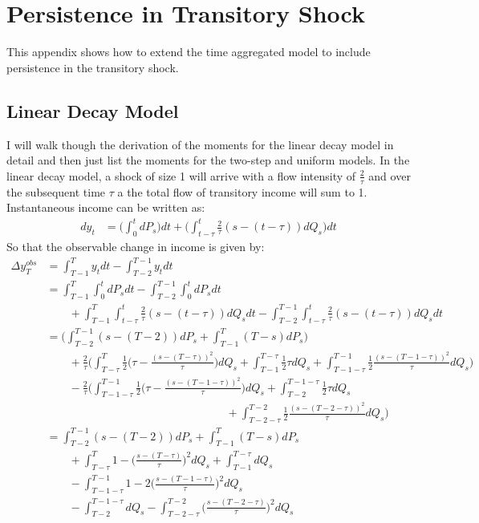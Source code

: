 \section{Persistence in Transitory Shock} \label{persistence_appendix}
This appendix shows how to extend the time aggregated model to include persistence in the transitory shock.

\subsection{Linear Decay Model}
I will walk though the derivation of the moments for the linear decay model in detail and then just list the moments for the two-step and uniform models. In the linear decay model, a shock of size 1 will arrive with a flow intensity of $\frac{2}{\tau}$ and over the subsequent time $\tau$ a the total flow of transitory income will sum to 1. Instantaneous income can be written as:
 \begin{align*}
dy_t &= \Big(\int_{0}^{t} dP_s \Big) dt +\Big(\int_{t-\tau}^{t} \frac{2}{\tau}(s-(t-\tau)) dQ_s \Big)dt
 \end{align*}
So that the observable change in income is given by:
\begin{align}
\Delta y^{obs}_T &= \int_{T-1}^{T} y_t dt - \int_{T-2}^{T-1} y_t dt \nonumber \\ 
&= \int_{T-1}^{T} \int_{0}^{t}dP_s dt -\int_{T-2}^{T-1} \int_{0}^{t}dP_s dt \nonumber \\
& \qquad +  \int_{T-1}^{T} \int_{t-\tau}^{t} \frac{2}{\tau}(s-(t-\tau)) dQ_s dt -\int_{T-2}^{T-1}\int_{t-\tau}^{t} \frac{2}{\tau}(s-(t-\tau)) dQ_s dt \nonumber \\
&= \Big(\int_{T-2}^{T-1} (s-(T-2))dP_s  + \int_{T-1}^{T} (T-s)dP_s \Big) \nonumber \\
&  \qquad +\frac{2}{\tau} \Big(\int_{T-\tau}^{T} \frac{1}{2}\Big(\tau - \frac{(s-(T-\tau))^2}{\tau} \Big)dQ_s  +\int_{T-1}^{T-\tau} \frac{1}{2}\tau dQ_s  +\int_{T-1-\tau}^{T-1} \frac{1}{2}\frac{(s-(T-1-\tau))^2}{\tau} dQ_s \Big) \nonumber \\
& \qquad -\frac{2}{\tau}  \Big(\int_{T-1-\tau}^{T-1} \frac{1}{2}\Big(\tau - \frac{(s-(T-1-\tau))^2}{\tau} \Big)dQ_s  +\int_{T-2}^{T-1-\tau} \frac{1}{2}\tau dQ_s \nonumber \\
& \qquad \qquad \qquad \qquad \qquad \qquad \qquad \qquad  +\int_{T-2-\tau}^{T-2} \frac{1}{2}\frac{(s-(T-2-\tau))^2}{\tau} dQ_s \Big) \nonumber \\
&= \int_{T-2}^{T-1} (s-(T-2))dP_s  + \int_{T-1}^{T} (T-s)dP_s  \nonumber \\
&  \qquad +\int_{T-\tau}^{T} 1 - \Big(\frac{s-(T-\tau)}{\tau}\Big)^2 dQ_s  +\int_{T-1}^{T-\tau}  dQ_s   \nonumber \\
& \qquad - \int_{T-1-\tau}^{T-1} 1 - 2\Big(\frac{s-(T-1-\tau)}{\tau}\Big)^2 dQ_s \nonumber \\
& \qquad-  \int_{T-2}^{T-1-\tau}  dQ_s  -\int_{T-2-\tau}^{T-2} \Big(\frac{s-(T-2-\tau)}{\tau}\Big)^2 dQ_s 
\end{align}
